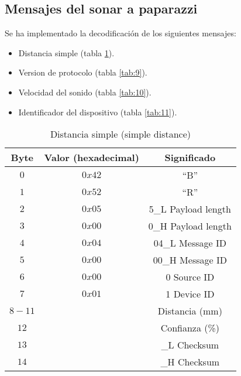 \subsection{Mensajes del sonar a paparazzi}

Se ha implementado la decodificación de los siguientes mensajes:
\begin{itemize}
	\item Distancia simple (tabla \ref{tab:8}).
	\item Version de protocolo (tabla \ref{tab:9}).
	\item Velocidad del sonido (tabla \ref{tab:10}).
	\item Identificador del dispositivo (tabla \ref{tab:11}).
\end{itemize}

\begin{table}[h]
	\centering
	\caption{Distancia simple (simple distance)}
	\begin{tabular}{|c|c|c|}
		\hline
		\textbf{Byte}	&\textbf{Valor (hexadecimal)} &\textbf{Significado} \\ \hline  \hline
		$0$		&$0x42$		& ``B'' \\ \hline
		$1$		&$0x52$		& ``R'' \\ \hline
		$2$		&$0x05$		& 5\_L Payload length \\ \hline
		$3$		&$0x00$		& 0\_H Payload length \\ \hline
		$4$		&$0x04$		& 04\_L Message ID \\ \hline
		$5$		&$0x00$		& 00\_H Message ID \\ \hline
		$6$		&$0x00$		& 0    Source ID \\ \hline 
		$7$		&$0x01$		& 1    Device ID \\ \hline
		$8-11$	&			& Distancia (mm) \\ \hline
		$12$	&			& Confianza (\%)\\ \hline  
		$13$	&			& \_L Checksum\\ \hline   
		$14$	&			& \_H Checksum\\ \hline  
	\end{tabular}
	\label{tab:8}
\end{table}

